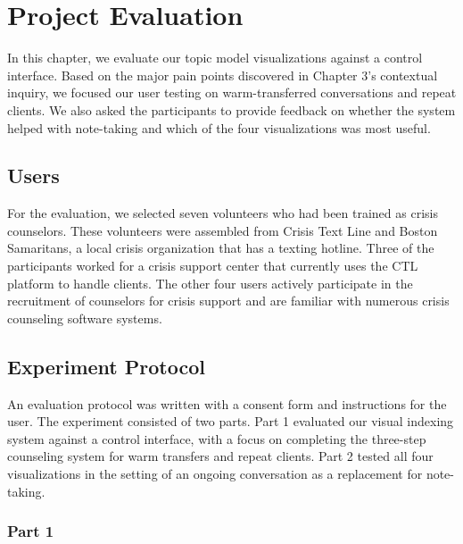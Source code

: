 \chapter{Project Evaluation}

In this chapter, we evaluate our topic model visualizations against a control interface.
Based on the major pain points discovered in Chapter 3's contextual inquiry, we
focused our user testing on warm-transferred conversations and repeat clients. We
also asked the participants to provide feedback on whether the system helped with
note-taking and which of the four visualizations was most useful.

\section{Users}

For the evaluation, we selected seven volunteers who had been trained as crisis
counselors. These volunteers were assembled from Crisis Text Line and Boston Samaritans,
a local crisis organization that has a texting hotline. Three of the participants worked
for a crisis support center that currently uses the CTL platform to handle clients. The
other four users actively participate in the recruitment of counselors for crisis support
and are familiar with numerous crisis counseling software
systems.

\section{Experiment Protocol}

An evaluation protocol was written with a consent form and instructions for the user.
The experiment consisted of two parts. Part 1 evaluated our visual indexing system
against a control interface, with a focus on completing the three-step counseling
system for warm transfers and repeat clients. Part 2 tested all four visualizations in
the setting of an ongoing conversation as a replacement for note-taking.

\subsection{Part 1}

